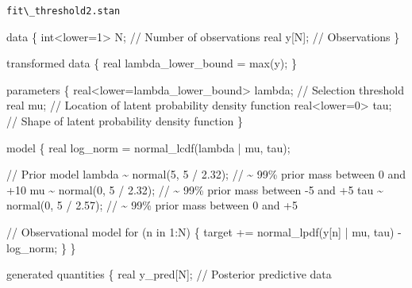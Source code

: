 \documentclass[
  letterpaper,
  DIV=11,
  numbers=noendperiod]{scrartcl}
\newenvironment{Shaded}{\begin{snugshade}}{\end{snugshade}}
\newcommand{\CommentTok}[1]{\textcolor[rgb]{0.37,0.37,0.37}{#1}}
\newcommand{\ControlFlowTok}[1]{\textcolor[rgb]{0.00,0.23,0.31}{#1}}
\newcommand{\DataTypeTok}[1]{\textcolor[rgb]{0.68,0.00,0.00}{#1}}
\newcommand{\DecValTok}[1]{\textcolor[rgb]{0.68,0.00,0.00}{#1}}
\newcommand{\FloatTok}[1]{\textcolor[rgb]{0.68,0.00,0.00}{#1}}
\newcommand{\KeywordTok}[1]{\textcolor[rgb]{0.00,0.23,0.31}{#1}}
\newcommand{\NormalTok}[1]{\textcolor[rgb]{0.00,0.23,0.31}{#1}}
\begin{document}
\begin{codelisting}

\caption{\texttt{fit\textbackslash\_threshold2.stan}}

\begin{Shaded}
\begin{Highlighting}[]
\KeywordTok{data}\NormalTok{ \{}
  \DataTypeTok{int}\NormalTok{\textless{}}\KeywordTok{lower}\NormalTok{=}\DecValTok{1}\NormalTok{\textgreater{} N; }\CommentTok{// Number of observations}
  \DataTypeTok{real}\NormalTok{ y[N];      }\CommentTok{// Observations}
\NormalTok{\}}

\KeywordTok{transformed data}\NormalTok{ \{}
  \DataTypeTok{real}\NormalTok{ lambda\_lower\_bound = max(y);}
\NormalTok{\}}

\KeywordTok{parameters}\NormalTok{ \{}
  \DataTypeTok{real}\NormalTok{\textless{}}\KeywordTok{lower}\NormalTok{=lambda\_lower\_bound\textgreater{} lambda; }\CommentTok{// Selection threshold}
  \DataTypeTok{real}\NormalTok{ mu;           }\CommentTok{// Location of latent probability density function}
  \DataTypeTok{real}\NormalTok{\textless{}}\KeywordTok{lower}\NormalTok{=}\DecValTok{0}\NormalTok{\textgreater{} tau; }\CommentTok{// Shape of latent probability density function}
\NormalTok{\}}

\KeywordTok{model}\NormalTok{ \{}
  \DataTypeTok{real}\NormalTok{ log\_norm = normal\_lcdf(lambda | mu, tau);}
  
  \CommentTok{// Prior model}
\NormalTok{  lambda \textasciitilde{} normal(}\DecValTok{5}\NormalTok{, }\DecValTok{5}\NormalTok{ / }\FloatTok{2.32}\NormalTok{); }\CommentTok{// \textasciitilde{} 99\% prior mass between  0 and +10}
\NormalTok{  mu \textasciitilde{} normal(}\DecValTok{0}\NormalTok{, }\DecValTok{5}\NormalTok{ / }\FloatTok{2.32}\NormalTok{);     }\CommentTok{// \textasciitilde{} 99\% prior mass between {-}5 and +5}
\NormalTok{  tau \textasciitilde{} normal(}\DecValTok{0}\NormalTok{, }\DecValTok{5}\NormalTok{ / }\FloatTok{2.57}\NormalTok{);    }\CommentTok{// \textasciitilde{} 99\% prior mass between  0 and +5}
  
  \CommentTok{// Observational model}
  \ControlFlowTok{for}\NormalTok{ (n }\ControlFlowTok{in} \DecValTok{1}\NormalTok{:N) \{}
    \KeywordTok{target +=}\NormalTok{ normal\_lpdf(y[n] | mu, tau) {-} log\_norm;}
\NormalTok{  \}}
\NormalTok{\}}

\KeywordTok{generated quantities}\NormalTok{ \{}
  \DataTypeTok{real}\NormalTok{ y\_pred[N]; }\CommentTok{// Posterior predictive data}


\end{Highlighting}
\end{Shaded}
\end{codelisting}
\end{document}
